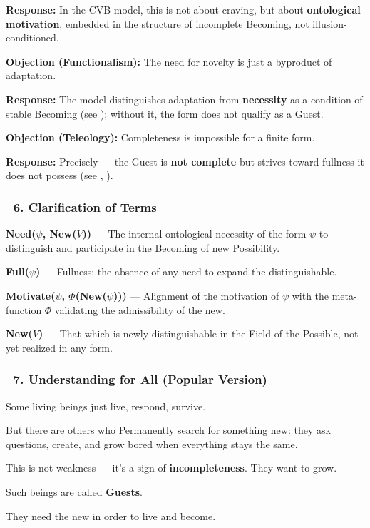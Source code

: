 \documentclass[12pt]{article}
\begin{document}
\textbf{Response:} In the CVB model, this is not about craving, but about \textbf{ontological motivation}, embedded in the structure of incomplete Becoming, not illusion-conditioned.

\textbf{Objection (Functionalism):} The need for novelty is just a byproduct of adaptation.

\textbf{Response:} The model distinguishes adaptation from \textbf{necessity} as a condition of stable Becoming (see \text{[15.3]}); without it, the form does not qualify as a Guest.

\textbf{Objection (Teleology):} Completeness is impossible for a finite form.

\textbf{Response:} Precisely — the Guest is \textbf{not complete} but strives toward fullness it does not possess (see \text{[4.3]}, \text{[13]}).

\subsubsection*{🔹 6. Clarification of Terms}

\textbf{Need($\psi$, New($V$))} — The internal ontological necessity of the form $\psi$ to distinguish and participate in the Becoming of new Possibility.

\textbf{Full($\psi$)} — Fullness: the absence of any need to expand the distinguishable.

\textbf{Motivate($\psi$, $\Phi$(New($\psi$)))} — Alignment of the motivation of $\psi$ with the meta-function $\Phi$ validating the admissibility of the new.

\textbf{New($V$)} — That which is newly distinguishable in the Field of the Possible, not yet realized in any form.

\subsubsection*{🔹 7. Understanding for All (Popular Version)}

Some living beings just live, respond, survive.

But there are others who Permanently search for something new: they ask questions, create, and grow bored when everything stays the same.

This is not weakness — it’s a sign of \textbf{incompleteness}. They want to grow.

Such beings are called \textbf{Guests}.

They need the new in order to live and become.
\end{document}
